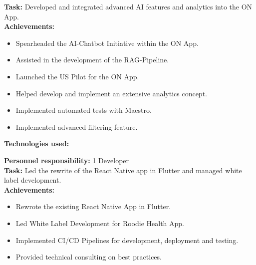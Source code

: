 \documentclass[10pt,a4paper,normalphoto]{altacv}
\begin{document}
\begin{fullwidth}
\textbf{Task:} Developed and integrated advanced AI features and analytics into the ON App.\\
\textbf{Achievements:}
\begin{itemize}
    \item Spearheaded the AI-Chatbot Initiative within the ON App.
    \item Assisted in the development of the RAG-Pipeline.
    \item Launched the US Pilot for the ON App.
    \item Helped develop and implement an extensive analytics concept.
    \item Implemented automated tests with Maestro.
    \item Implemented advanced filtering feature.
\end{itemize}

\textbf{Technologies used:}\\[0.4em]

\newpage
\textbf{Personnel responsibility:} 1 Developer\\
\textbf{Task:} Led the rewrite of the React Native app in Flutter and managed white label development.\\
\textbf{Achievements:}
\begin{itemize}
    \item Rewrote the existing React Native App in Flutter.
    \item Led White Label Development for Roodie Health App.
    \item Implemented CI/CD Pipelines for development, deployment and testing.
    \item Provided technical consulting on best practices.
\end{itemize}


\end{fullwidth}
\end{document}
